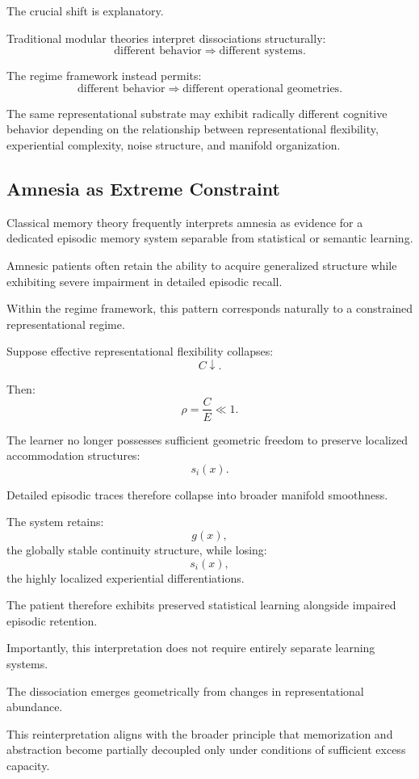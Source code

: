 \documentclass[12pt,a4paper]{article}
\begin{document}
The crucial shift is explanatory.

Traditional modular theories interpret dissociations structurally:
\[
\text{different behavior}
\Rightarrow
\text{different systems}.
\]

The regime framework instead permits:
\[
\text{different behavior}
\Rightarrow
\text{different operational geometries}.
\]

The same representational substrate may exhibit radically different cognitive behavior depending on the relationship between representational flexibility, experiential complexity, noise structure, and manifold organization.

\subsection{Amnesia as Extreme Constraint}

Classical memory theory frequently interprets amnesia as evidence for a dedicated episodic memory system separable from statistical or semantic learning.

Amnesic patients often retain the ability to acquire generalized structure while exhibiting severe impairment in detailed episodic recall.

Within the regime framework, this pattern corresponds naturally to a constrained representational regime.

Suppose effective representational flexibility collapses:
\[
C
\downarrow.
\]

Then:
\[
\rho
=
\frac{C}{E}
\ll
1.
\]

The learner no longer possesses sufficient geometric freedom to preserve localized accommodation structures:
\[
s_i(x).
\]

Detailed episodic traces therefore collapse into broader manifold smoothness.

The system retains:
\[
g(x),
\]
the globally stable continuity structure,
while losing:
\[
s_i(x),
\]
the highly localized experiential differentiations.

The patient therefore exhibits preserved statistical learning alongside impaired episodic retention.

Importantly, this interpretation does not require entirely separate learning systems.

The dissociation emerges geometrically from changes in representational abundance.

This reinterpretation aligns with the broader principle that memorization and abstraction become partially decoupled only under conditions of sufficient excess capacity.
\end{document}
